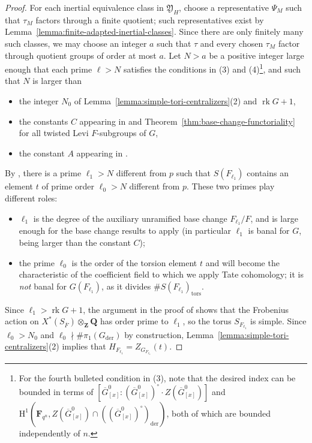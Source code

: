 \documentclass[reqno]{amsart}
\numberwithin{equation}{subsection}
\newcommand{\F}{\mathbf{F}}
\newcommand{\Q}{\mathbf{Q}}
\newcommand{\Z}{\mathbf{Z}}
\newcommand{\ol}[1]{\overline{#1}}
\DeclareMathOperator{\der}{der}
\DeclareMathOperator{\rk}{rk}
\newcommand{\rH}{\ensuremath{\mathrm{H}}\xspace}
\theoremstyle{remark}
\numberwithin{equation}{subsection}
\numberwithin{figure}{subsection}
\begin{document}
\begin{proof}
For each inertial equivalence class in $\mathfrak{Y}_H$, choose a representative $\Psi_M$ such that $\tau_M$ factors through a finite quotient; such representatives exist by Lemma~\ref{lemma:finite-adapted-inertial-classes}. Since there are only finitely many such classes, we may choose an integer $a$ such that $\tau$ and every chosen $\tau_M$ factor through quotient groups of order at most $a$. Let $N > a$ be a positive integer large enough that each prime $\ell > N$ satisfies the conditions in (3) and (4)\footnote{For the fourth bulleted condition in (3), note that the desired index can be bounded in terms of $[\ol G^0_{[x]}: (\ol G^0_{[x]})^\circ \cdot Z(\ol G^0_{[x]})]$ and $\rH^1(\F_{q^n}, Z(\ol G^0_{[x]}) \cap ((\ol G^0_{[x]})^\circ)_{\der})$, both of which are bounded independently of $n$.}, and such that $N$ is larger than
\begin{itemize}
\item the integer $N_0$ of Lemma~\ref{lemma:simple-tori-centralizers}(2) and $\rk G + 1$,
\item the constants $C$ appearing in \cite[Corollary~4.4.1]{Cot26b} and Theorem~\ref{thm:base-change-functoriality} for all twisted Levi $F$-subgroups of $G$,
\item the constant $A$ appearing in \cite[Proposition~4.3.4]{Cot26b}.
\end{itemize}

By \cite[Lemma~5.3.5]{Cot26b}, there is a prime $\ell_1 > N$ different from $p$ such that $S(F_{\ell_1})$ contains an element $t$ of prime order $\ell_0 > N$ different from $p$. These two primes play different roles:
\begin{itemize}
\item $\ell_1$ is the degree of the auxiliary unramified base change $F_{\ell_1}/F$, and is large enough for the base change results to apply (in particular $\ell_1$ is banal for $G$, being larger than the constant $C$);
\item the prime $\ell_0$ is the order of the torsion element $t$ and will become the characteristic of the coefficient field to which we apply Tate cohomology; it is \emph{not} banal for $G(F_{\ell_1})$, as it divides $\#S(F_{\ell_1})_{\mathrm{tors}}$.
\end{itemize}
Since $\ell_1 > \rk G + 1$, the argument in the proof of \cite[Lemma~4.2.1(1)]{Cot26b} shows that the Frobenius action on $X^*(S_{\ol F})\otimes_\Z\Q$ has order prime to
$\ell_1$, so the torus $S_{F_{\ell_1}}$ is simple. Since $\ell_0 > N_0$ and $\ell_0 \nmid \#\pi_1(G_{\der})$ by construction, Lemma~\ref{lemma:simple-tori-centralizers}(2) implies that $H_{F_{\ell_1}} = Z_{G_{F_{\ell_1}}}(t)$.


\end{proof}
\end{document}
